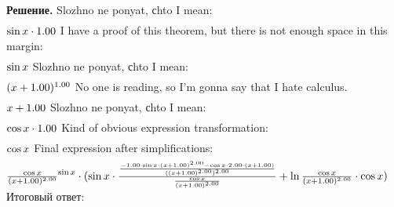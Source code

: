 \documentclass[12pt,a4paper]{extreport}
\theoremstyle{plain}
\theoremstyle{definition}
\newenvironment{solution}%
{\par\noindent\textbf{Решение. }}%
{\bigskip}
\begin{document}
\begin{solution}
Slozhno ne ponyat, сhto I mean: 
\begin{gather}
\end{gather}
\begin{math}
\sin x \cdot 1.00 \\
\end{math}
I have a proof of this theorem, but there is not enough space in this margin: 
\begin{gather}
\end{gather}
\begin{math}
\sin x \\
\end{math}
Slozhno ne ponyat, сhto I mean: 
\begin{gather}
\end{gather}
\begin{math}
(x + 1.00 )^ {1.00 }\\
\end{math}
No one is reading, so I'm gonna say that I hate calculus.
\begin{gather}
\end{gather}
\begin{math}
x + 1.00 \\
\end{math}
Slozhno ne ponyat, сhto I mean: 
\begin{gather}
\end{gather}
\begin{math}
\cos x \cdot 1.00 \\
\end{math}
Kind of obvious expression transformation: 
\begin{gather}
\end{gather}
\begin{math}
\cos x \\
\end{math}
Final expression after simplifications:
\begin{gather}
\end{gather}
\begin{math}
\frac {\cos x }{(x + 1.00 )^ {2.00 }}^ {\sin x }\cdot (\sin x \cdot \frac {\frac {-1.00 \cdot \sin x \cdot (x + 1.00 )^ {2.00 }- \cos x \cdot 2.00 \cdot (x + 1.00 )}{((x + 1.00 )^ {2.00 })^ {2.00 }}}{\frac {\cos x }{(x + 1.00 )^ {2.00 }}}+ \ln \frac {\cos x }{(x + 1.00 )^ {2.00 }}\cdot \cos x )\\
\end{math}
Итоговый ответ: 
\begin{gather}
\end{gather}

\end{solution}
\end{document}
